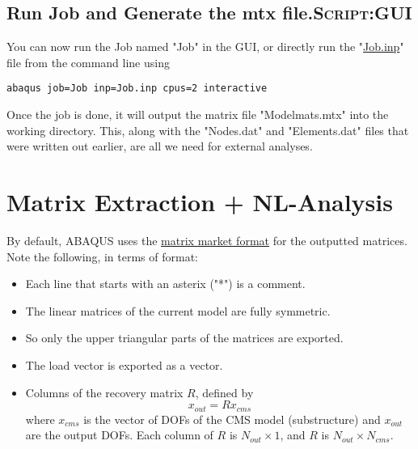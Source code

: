 \documentclass[11pt]{article}
\begin{document}
\subsection{Run Job and Generate the mtx file.\hfill{}\textsc{Script:GUI}}
\label{sec:org6590895}
You can now run the Job named "Job" in the GUI, or directly run the "\href{https://github.com/Nidish96/Abaqus4Joints/blob/main/assets/demo/Job.inp}{Job.inp}" file from the command line using
\begin{verbatim}
abaqus job=Job inp=Job.inp cpus=2 interactive
\end{verbatim}
Once the job is done, it will output the matrix file "Modelmats.mtx" into the working directory.
This, along with the "Nodes.dat" and "Elements.dat" files that were written out earlier, are all we need for external analyses.
\pagebreak
\section{Matrix Extraction + NL-Analysis}
\label{sec:mex}
By default, ABAQUS uses the \href{https://math.nist.gov/MatrixMarket/}{matrix market format} for the outputted matrices.
Note the following, in terms of format:
\begin{itemize}
\item Each line that starts with an asterix ("*") is a comment.
\item The linear matrices of the current model are fully symmetric.
\item So only the upper triangular parts of the matrices are exported.
\item The load vector is exported as a vector.
\item Columns of the recovery matrix \(R\), defined by
$$ x_{out} = R x_{cms} $$
where \(x_{cms}\) is the vector of DOFs of the CMS model (substructure) and \(x_{out}\) are the output DOFs.
Each column of \(R\) is \(N_{out}\times 1\), and \(R\) is \(N_{out}\times N_{cms}\).
\end{itemize}
\end{document}
